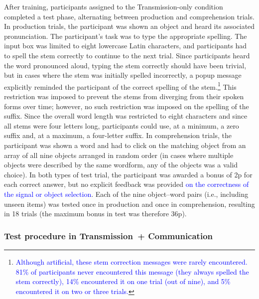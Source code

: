 \documentclass[doc,biblatex]{apa7}
\newcommand\newmaterial[1]{\textcolor{blue}{#1}}
\begin{document}
After training, participants assigned to the Transmission-only condition completed a test phase, alternating between production and comprehension trials. In production trials, the participant was shown an object and heard its associated pronunciation. The participant's task was to type the appropriate spelling. The input box was limited to eight lowercase Latin characters, and participants had to spell the stem correctly to continue to the next trial. Since participants heard the word pronounced aloud, typing the stem correctly should have been trivial, but in cases where the stem was initially spelled incorrectly, a popup message explicitly reminded the participant of the correct spelling of the stem.\footnote{\newmaterial{Although artificial, these stem correction messages were rarely encountered. 81\% of participants never encountered this message (they always spelled the stem correctly), 14\% encountered it on one trial (out of nine), and 5\% encountered it on two or three trials.}} This restriction was imposed to prevent the stems from diverging from their spoken forms over time; however, no such restriction was imposed on the spelling of the suffix. Since the overall word length was restricted to eight characters and since all stems were four letters long, participants could use, at a minimum, a zero suffix and, at a maximum, a four-letter suffix. In comprehension trials, the participant was shown a word and had to click on the matching object from an array of all nine objects arranged in random order (in cases where multiple objects were described by the same wordform, any of the objects was a valid choice). In both types of test trial, the participant was awarded a bonus of 2p for each correct answer, but no explicit feedback was provided \newmaterial{on the correctness of the signal or object selection}. Each of the nine object--word pairs (i.e., including unseen items) was tested once in production and once in comprehension, resulting in 18 trials (the maximum bonus in test was therefore 36p).

\subsubsection{Test procedure in Transmission~+ Communication}
\end{document}
